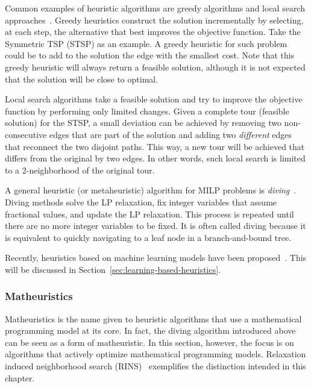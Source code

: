 Common examples of heuristic algorithms are greedy algorithms and local search approaches~\cite{nemhauserIntegerCombinatorialOptimization1999,wolseyIntegerProgramming1998}.
Greedy heuristics construct the solution incrementally by selecting, at each step, the alternative that best improves the objective function.
Take the Symmetric TSP (STSP) as an example.
A greedy heuristic for such problem could be to add to the solution the edge with the smallest cost.
Note that this greedy heuristic will always return a feasible solution, although it is not expected that the solution will be close to optimal.

Local search algorithms take a feasible solution and try to improve the objective function by performing only limited changes.
Given a complete tour (feasible solution) for the STSP, a small deviation can be achieved by removing two non-consecutive edges that are part of the solution and adding two \emph{different} edges that reconnect the two disjoint paths.
This way, a new tour will be achieved that differs from the original by two edges.
In other words, such local search is limited to a 2-neighborhood of the original tour.

A general heuristic (or metaheuristic) algorithm for MILP problems is \emph{diving}~\cite{fischettiHeuristicsMixedInteger2011}.
Diving methods solve the LP relaxation, fix integer variables that assume fractional values, and update the LP relaxation.
This process is repeated until there are no more integer variables to be fixed.
It is often called diving because it is equivalent to quickly navigating to a leaf node in a branch-and-bound tree.

Recently, heuristics based on machine learning models have been proposed~\cite{bengioMachineLearningCombinatorial2021}.
This will be discussed in Section~\ref{sec:learning-based-heuristics}.

\subsubsection{Matheuristics}

Matheuristics is the name given to heuristic algorithms that use a mathematical programming model at its core.
In fact, the diving algorithm introduced above can be seen as a form of matheuristic.
In this section, however, the focus is on algorithms that actively optimize mathematical programming models.
Relaxation induced neighborhood search (RINS)~\cite{maniezzoMatheuristicsAlgorithmsImplementations2021} exemplifies the distinction intended in this chapter.

